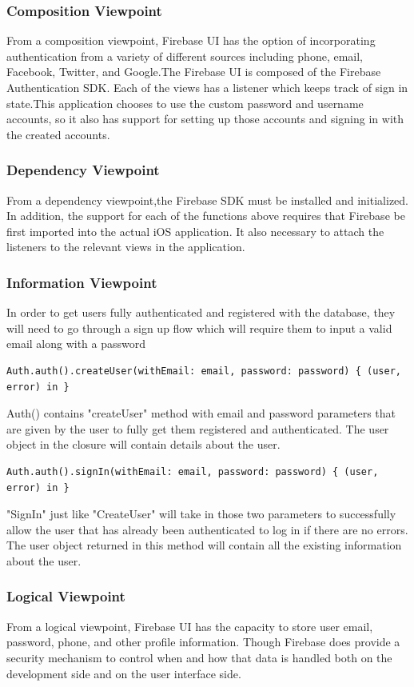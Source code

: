 \documentclass[onecolumn, draftclsnofoot,10pt, compsoc]{IEEEtran}
\begin{document}
\subsubsection{Composition Viewpoint}
From a composition viewpoint, Firebase UI has the option of incorporating authentication from a variety of different sources including phone, email, Facebook, Twitter, and Google.The Firebase UI is composed of the Firebase Authentication SDK. Each of the views has a listener which keeps track of sign in state.This application chooses to use the custom password and username accounts, so it also has support for setting up those accounts and signing in with the created accounts.
\subsubsection{Dependency Viewpoint}
From a dependency viewpoint,the Firebase SDK must be installed and initialized. In addition, the support for each of the functions above requires that Firebase be first imported into the actual iOS application. It also necessary to attach the listeners to the relevant views in the application. 
\subsubsection{Information Viewpoint}
In order to get users fully authenticated and registered with the database, they will need to go through a sign up flow which will require them to input a valid email along with a password 

\begin{verbatim}
Auth.auth().createUser(withEmail: email, password: password) { (user, error) in }
\end{verbatim}
Auth() contains "createUser" method with email and password parameters that are given by the user to fully get them registered and authenticated. The user object in the closure will contain details about the user. 

\begin{verbatim}
Auth.auth().signIn(withEmail: email, password: password) { (user, error) in }\end{verbatim}

\noindent "SignIn" just like "CreateUser" will take in those two parameters to successfully allow the user that has already been authenticated to log in if there are no errors. The user object returned in this method will contain all the existing information about the user.
\subsubsection{Logical Viewpoint}
From a logical viewpoint, Firebase UI has the capacity to store user email, password, phone, and other profile information. Though Firebase does provide a security mechanism to control when and how that data is handled both on the development side and on the user interface side.
\end{document}
